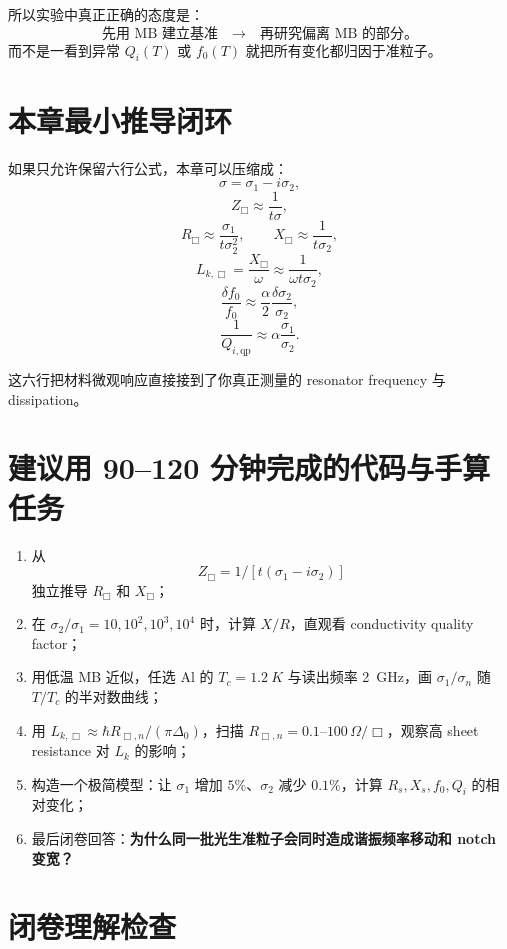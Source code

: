 \documentclass[11pt,a4paper,openany]{ctexrep}
\newcommand{\qp}{\mathrm{qp}}
\begin{document}
所以实验中真正正确的态度是：
\[
\boxed{
\text{先用 MB 建立基准}
\quad\rightarrow\quad
\text{再研究偏离 MB 的部分。}
}
\]
而不是一看到异常 $Q_i(T)$ 或 $f_0(T)$ 就把所有变化都归因于准粒子。

\section{本章最小推导闭环}

如果只允许保留六行公式，本章可以压缩成：
\[
\sigma=\sigma_1-i\sigma_2,
\]
\[
Z_{\Box}\approx\frac{1}{t\sigma},
\]
\[
R_{\Box}\approx\frac{\sigma_1}{t\sigma_2^2},
\qquad
X_{\Box}\approx\frac{1}{t\sigma_2},
\]
\[
L_{k,\Box}=\frac{X_{\Box}}{\omega}
\approx\frac{1}{\omega t\sigma_2},
\]
\[
\frac{\delta f_0}{f_0}
\approx
\frac{\alpha}{2}\frac{\delta\sigma_2}{\sigma_2},
\]
\[
\frac{1}{Q_{i,\qp}}
\approx
\alpha\frac{\sigma_1}{\sigma_2}.
\]

这六行把材料微观响应直接接到了你真正测量的 resonator frequency 与 dissipation。

\section{建议用 90--120 分钟完成的代码与手算任务}

\begin{enumerate}
  \item 从
  \[
  Z_{\Box}=1/[t(\sigma_1-i\sigma_2)]
  \]
  独立推导 $R_{\Box}$ 和 $X_{\Box}$；
  \item 在 $\sigma_2/\sigma_1=10,10^2,10^3,10^4$ 时，计算 $X/R$，直观看 conductivity quality factor；
  \item 用低温 MB 近似，任选 Al 的 $T_c=\SI{1.2}{K}$ 与读出频率 \SI{2}{GHz}，画 $\sigma_1/\sigma_n$ 随 $T/T_c$ 的半对数曲线；
  \item 用 $L_{k,\Box}\approx\hbar R_{\Box,n}/(\pi\Delta_0)$，扫描 $R_{\Box,n}=0.1$--$100\,\Omega/\Box$，观察高 sheet resistance 对 $L_k$ 的影响；
  \item 构造一个极简模型：让 $\sigma_1$ 增加 $5\%$、$\sigma_2$ 减少 $0.1\%$，计算 $R_s,X_s,f_0,Q_i$ 的相对变化；
  \item 最后闭卷回答：\textbf{为什么同一批光生准粒子会同时造成谐振频率移动和 notch 变宽？}
\end{enumerate}

\section{闭卷理解检查}
\end{document}
